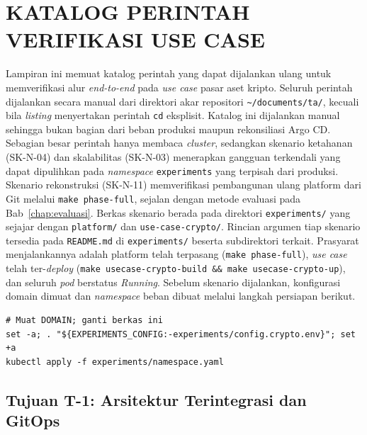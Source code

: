 \cleardoublepage
\chapter{KATALOG PERINTAH VERIFIKASI USE CASE}
\label{appx:verifikasi}

Lampiran ini memuat katalog perintah yang dapat dijalankan ulang untuk memverifikasi alur \textit{end-to-end} pada \textit{use case} pasar aset kripto. Seluruh perintah dijalankan secara manual dari direktori akar repositori \texttt{\textasciitilde/documents/ta/}, kecuali bila \textit{listing} menyertakan perintah \texttt{cd} eksplisit. Katalog ini dijalankan manual sehingga bukan bagian dari beban produksi maupun rekonsiliasi Argo CD. Sebagian besar perintah hanya membaca \textit{cluster}, sedangkan skenario ketahanan (SK-N-04) dan skalabilitas (SK-N-03) menerapkan gangguan terkendali yang dapat dipulihkan pada \textit{namespace} \texttt{experiments} yang terpisah dari produksi. Skenario rekonstruksi (SK-N-11) memverifikasi pembangunan ulang platform dari Git melalui \texttt{make phase-full}, sejalan dengan metode evaluasi pada Bab~\ref{chap:evaluasi}. Berkas skenario berada pada direktori \texttt{experiments/} yang sejajar dengan \texttt{platform/} dan \texttt{use-case-crypto/}. Rincian argumen tiap skenario tersedia pada \texttt{README.md} di \texttt{experiments/} beserta subdirektori terkait. Prasyarat menjalankannya adalah platform telah terpasang (\texttt{make phase-full}), \textit{use case} telah ter-\textit{deploy} (\texttt{make usecase-crypto-build \&\& make usecase-crypto-up}), dan seluruh \textit{pod} berstatus \textit{Running}. Sebelum skenario dijalankan, konfigurasi domain dimuat dan \textit{namespace} beban dibuat melalui langkah persiapan berikut.

\begin{lstlisting}[caption={Persiapan \textit{namespace} \textit{load generator} (dari \texttt{\textasciitilde/documents/ta/})},basicstyle=\ttfamily\footnotesize,breaklines=true,captionpos=t]
# Muat DOMAIN; ganti berkas ini
set -a; . "${EXPERIMENTS_CONFIG:-experiments/config.crypto.env}"; set +a
kubectl apply -f experiments/namespace.yaml
\end{lstlisting}

\section{Tujuan T-1: Arsitektur Terintegrasi dan GitOps}
\label{sec:appx-t1}

